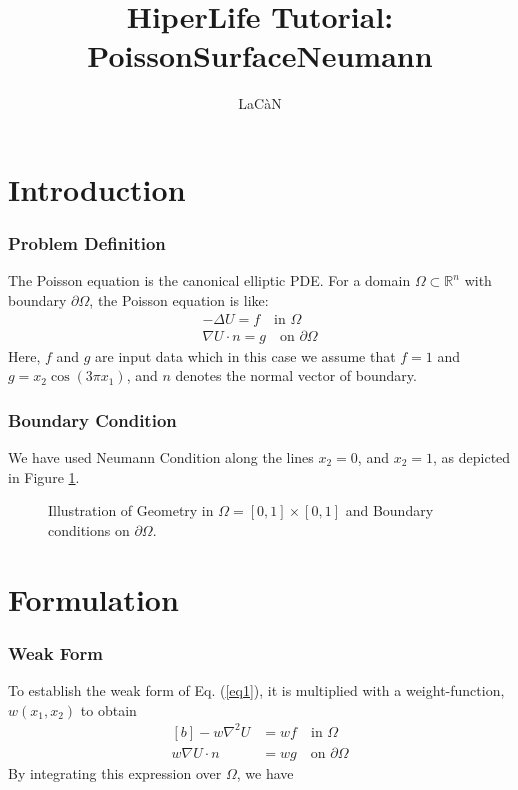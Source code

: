 \documentclass[]{article}
\begin{document}
\title{HiperLife Tutorial: PoissonSurfaceNeumann}
\author{LaCàN}
\maketitle

\linenumbers
\section{Introduction} \label{sec: Int}
\subsubsection{Problem Definition} \label{sec: pd} 
The Poisson equation is the canonical elliptic PDE. For a domain $\Omega \subset \mathbb{R}^n$ with boundary $\partial \Omega$, the Poisson equation is like:
\begin{equation}\label{eq1}
	\begin{aligned}
		 -\Delta U =f \quad  \text{in } \Omega \\
		 \nabla U \cdot n = g  \quad  \text{on }  \partial \Omega
	\end{aligned}
\end{equation}
Here, $f$ and $g$ are input data which in this case we assume that $f = 1$ and $g=x_{2}\cos{(3\pi x_{1})}$, and $n$ denotes the normal vector of boundary.
\subsubsection{Boundary Condition} \label{sec: B.C}
We have used Neumann Condition along the lines $x_{2}=0$, and $x_{2}=1$, as depicted in Figure \ref{fig_SB}.

\begin{figure}[htbp]
	\centering
	
	\caption{Illustration of Geometry in $\Omega =[0,1]\times[0,1]$ and Boundary conditions on $\partial \Omega$.}
	\label{fig_SB}
\end{figure}

\section{Formulation} \label{sec: frml}
\subsubsection{Weak Form} \label{sec: WF}
To establish the weak form of Eq. (\ref{eq1}), it is multiplied with a weight-function, $w(x_1, x_2)$ to obtain
\begin{equation}\label{eq2}
	\begin{aligned}[b]
		-w\nabla^2 U &= wf \quad  \text{in }  \Omega \\
		w\nabla U \cdot n &= wg  \quad  \text{on }  \partial \Omega
	\end{aligned}
\end{equation}
By integrating this expression over $\Omega$, we have
\end{document}
